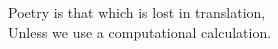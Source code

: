 \begin{minipage}{\linewidth}
\begin{displayquote}
  Poetry is that which is lost in translation, \\
  Unless we use a computational calculation.  \\  
\end{displayquote}
\end{minipage}


